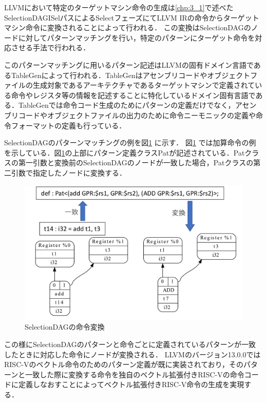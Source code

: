 
LLVMにおいて特定のターゲットマシン命令の生成は\ref{chp:3_1}で述べたSelectionDAGISelパスによるSelectフェーズにてLLVM IRの命令からターゲットマシン命令に変換されることによって行われる．
この変換はSelectionDAGのノードに対してパターンマッチングを行い，特定のパターンにターゲット命令を対応させる手法で行われる．

このパターンマッチングに用いるパターン記述はLLVMの固有ドメイン言語であるTableGenによって行われる．TableGenはアセンブリコードやオブジェクトファイルの生成対象であるアーキテクチャであるターゲットマシンで定義されている命令やレジスタ等の情報を記述することに特化しているドメイン固有言語である．TableGenでは命令コード生成のためにパターンの定義だけでなく，アセンブリコードやオブジェクトファイルの出力のために命令ニーモニックの定義や命令フォーマットの定義も行っている．

SelectionDAGのパターンマッチングの例を図\ref{fig:SelectionDAG_example}
に示す．
図\ref{fig:SelectionDAG_example}
では加算命令の例を示している．図\ref{fig:SelectionDAG_example}の上部にパターン定義クラスPatが記述されている．Patクラスの第一引数と変換前のSelectionDAGのノードが一致した場合，Patクラスの第二引数で指定したノードに変換する．

\begin{figure}[bt]
    \centering
    \includegraphics[scale=0.6]{image/SelectionDAG_example.pdf}
    \caption{SelectionDAGの命令変換}
    \label{fig:SelectionDAG_example}
\end{figure}

この様にSelectionDAGのパターンと命令ごとに定義されているパターンが一致したときに対応した命令にノードが変換される．
LLVMのバージョン13.0.0ではRISC-Vのベクトル命令のためのパターン定義が既に実装されており，そのパターンと一致した際に変換する命令を独自のベクトル拡張付きRISC-Vの命令コードに定義しなおすことによってベクトル拡張付きRISC-V命令の生成を実現する．

